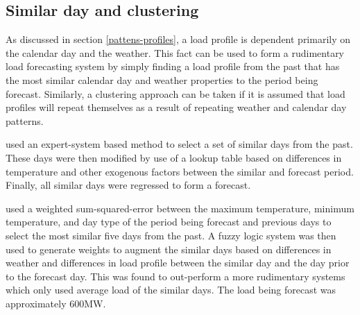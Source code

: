 \subsection{Similar day and clustering}
As discussed in section \ref{pattens-profiles}, a load profile is dependent primarily on the calendar day and the weather.
This fact can be used to form a rudimentary load forecasting system by simply finding a load profile from the past that has the most similar calendar day and weather properties to the period being forecast. 
Similarly, a clustering approach can be taken if it is assumed that load profiles will repeat themselves as a result of repeating weather and calendar day patterns.
\par
\citet{Rahman1993} used an expert-system based method to select a set of similar days from the past. 
These days were then modified by use of a lookup table based on differences in temperature and other exogenous factors between the similar and forecast period.
Finally, all similar days were regressed to form a forecast.
\par
\citet{Senjyu1998} used a weighted sum-squared-error between the maximum temperature, minimum temperature, and day type of the period being forecast and previous days to select the most similar five days from the past.
A fuzzy logic system was then used to generate weights to augment the similar days based on differences in weather and differences in load profile between the similar day and the day prior to the forecast day.
This was found to out-perform a more rudimentary systems which only used average load of the similar days.
The load being forecast was approximately 600MW.
\par
{}


